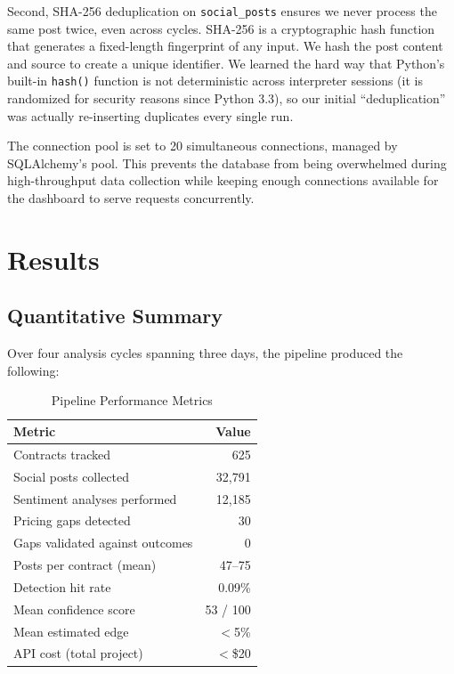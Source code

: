 \documentclass[conference]{IEEEtran}
\begin{document}
Second, SHA-256 deduplication on \texttt{social\_posts} ensures we never process the same post twice, even across cycles. SHA-256 is a cryptographic hash function that generates a fixed-length fingerprint of any input. We hash the post content and source to create a unique identifier. We learned the hard way that Python's built-in \texttt{hash()} function is not deterministic across interpreter sessions (it is randomized for security reasons since Python 3.3), so our initial ``deduplication'' was actually re-inserting duplicates every single run.

The connection pool is set to 20 simultaneous connections, managed by SQLAlchemy's pool. This prevents the database from being overwhelmed during high-throughput data collection while keeping enough connections available for the dashboard to serve requests concurrently.

\section{Results}

\subsection{Quantitative Summary}

Over four analysis cycles spanning three days, the pipeline produced the following:

\begin{table}[H]
\centering
\caption{Pipeline Performance Metrics}
\begin{tabular}{@{}lr@{}}
\toprule
\textbf{Metric} & \textbf{Value} \\
\midrule
Contracts tracked & 625 \\
Social posts collected & 32,791 \\
Sentiment analyses performed & 12,185 \\
Pricing gaps detected & 30 \\
Gaps validated against outcomes & 0 \\
Posts per contract (mean) & 47--75 \\
Detection hit rate & 0.09\% \\
Mean confidence score & 53 / 100 \\
Mean estimated edge & $<$5\% \\
API cost (total project) & $<$\$20 \\
\bottomrule
\end{tabular}
\label{tab:results}
\end{table}
\end{document}
